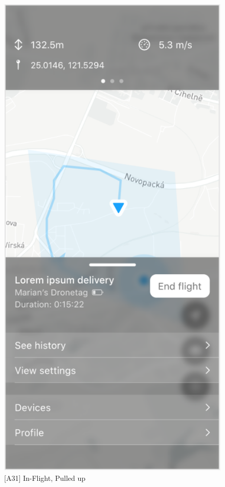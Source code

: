 \begin{figure}
\begin{minipage}{.45\textwidth}
        \includegraphics[width=.7\linewidth]{assets/user_interface_design/flight/in_flight_pulled_up.png}
        \caption{[A31] In-Flight, Pulled up}
        \label{fig:in_flight_pulled_up}
    \end{minipage}
    \label{fig:in_flight_all}
\end{figure}

